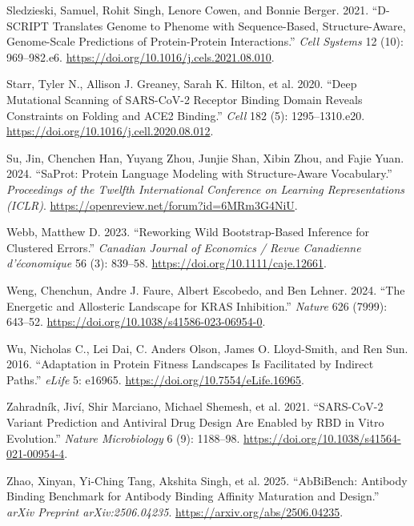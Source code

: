 \documentclass[
  11pt,
  us-letterpaper,
  DIV=11,
  numbers=noendperiod]{scrartcl}
\newlength{\cslhangindent}
\newenvironment{CSLReferences}[2] %
 {\begin{list}{}{%
  \setlength{\itemindent}{0pt}
  \setlength{\leftmargin}{0pt}
  \setlength{\parsep}{0pt}
  \ifodd #1
   \setlength{\leftmargin}{\cslhangindent}
   \setlength{\itemindent}{-1\cslhangindent}
  \fi
  \setlength{\itemsep}{#2\baselineskip}}}
 {\end{list}}
\begin{document}
\begin{CSLReferences}{1}{1}
Sledzieski, Samuel, Rohit Singh, Lenore Cowen, and Bonnie Berger. 2021.
{``{D-SCRIPT} Translates Genome to Phenome with Sequence-Based,
Structure-Aware, Genome-Scale Predictions of Protein-Protein
Interactions.''} \emph{Cell Systems} 12 (10): 969--982.e6.
\url{https://doi.org/10.1016/j.cels.2021.08.010}.

Starr, Tyler N., Allison J. Greaney, Sarah K. Hilton, et al. 2020.
{``Deep Mutational Scanning of {SARS-CoV-2} Receptor Binding Domain
Reveals Constraints on Folding and {ACE2} Binding.''} \emph{Cell} 182
(5): 1295--1310.e20. \url{https://doi.org/10.1016/j.cell.2020.08.012}.

Su, Jin, Chenchen Han, Yuyang Zhou, Junjie Shan, Xibin Zhou, and Fajie
Yuan. 2024. {``{SaProt}: Protein Language Modeling with Structure-Aware
Vocabulary.''} \emph{Proceedings of the Twelfth International Conference
on Learning Representations (ICLR)}.
\url{https://openreview.net/forum?id=6MRm3G4NiU}.

Webb, Matthew D. 2023. {``Reworking Wild Bootstrap-Based Inference for
Clustered Errors.''} \emph{Canadian Journal of Economics / Revue
Canadienne d'{é}conomique} 56 (3): 839--58.
\url{https://doi.org/10.1111/caje.12661}.

Weng, Chenchun, Andre J. Faure, Albert Escobedo, and Ben Lehner. 2024.
{``The Energetic and Allosteric Landscape for {KRAS} Inhibition.''}
\emph{Nature} 626 (7999): 643--52.
\url{https://doi.org/10.1038/s41586-023-06954-0}.

Wu, Nicholas C., Lei Dai, C. Anders Olson, James O. Lloyd-Smith, and Ren
Sun. 2016. {``Adaptation in Protein Fitness Landscapes Is Facilitated by
Indirect Paths.''} \emph{eLife} 5: e16965.
\url{https://doi.org/10.7554/eLife.16965}.

Zahradník, Jiví, Shir Marciano, Michael Shemesh, et al. 2021.
{``{SARS-CoV-2} Variant Prediction and Antiviral Drug Design Are Enabled
by {RBD} in Vitro Evolution.''} \emph{Nature Microbiology} 6 (9):
1188--98. \url{https://doi.org/10.1038/s41564-021-00954-4}.

Zhao, Xinyan, Yi-Ching Tang, Akshita Singh, et al. 2025. {``{AbBiBench}:
Antibody Binding Benchmark for Antibody Binding Affinity Maturation and
Design.''} \emph{arXiv Preprint arXiv:2506.04235}.
\url{https://arxiv.org/abs/2506.04235}.

\end{CSLReferences}
\end{document}
